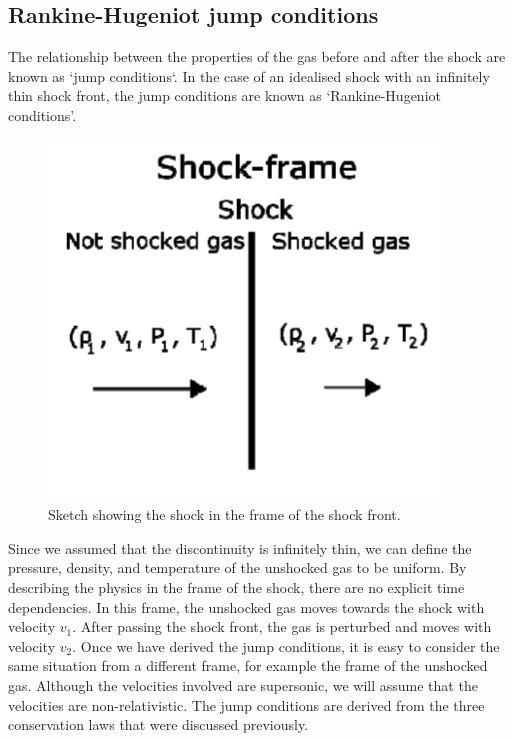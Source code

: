 \subsection{Rankine-Hugeniot jump conditions}
The relationship between the properties of the gas before and after the shock are known as `jump conditions`.
 In the case of an idealised shock with an infinitely thin shock front, the jump conditions are known as `Rankine-Hugeniot conditions'.
\par 
%
\begin{minipage}{0.27\textwidth}
	\begin{figure}[H]
		\includegraphics[width = \linewidth]{astro-processes/jump_conditions}
		\caption{Sketch showing the shock in the frame of the shock front.}
		\label{fig:AP:jump_conditions}
	\end{figure}
\end{minipage}
%
\begin{minipage}{0.67\textwidth}
	Since we assumed that the discontinuity is infinitely thin, we can define the pressure, density, and temperature of the unshocked gas to be uniform.
	 By describing the physics in the frame of the shock, there are no explicit time dependencies.
	 In this frame, the unshocked gas moves towards the shock with velocity \(v_1\).
	 After passing the shock front, the gas is perturbed and moves with velocity \(v_2\).
	 Once we have derived the jump conditions, it is easy to consider the same situation from a different frame, for example the frame of the unshocked gas.
	 Although the velocities involved are supersonic, we will assume that the velocities are non-relativistic.
	 The jump conditions are derived from the three conservation laws that were discussed previously.
\end{minipage}
%
\par 

